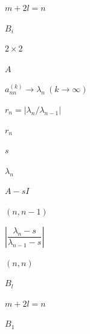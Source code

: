 \documentclass[UTF8,fontset=fandol]{ctexart}
\begin{document}
$m+2l=n$\par
$B_i$\par
$2\times2$\par
$A$\par
$a_{nn}^{(k)}\to\lambda_n\ (k\to\infty)$\par
$r_n=|\lambda_n/\lambda_{n-1}|$\par
$r_n$\par
$s$\par
$\lambda_n$\par
$A-sI$\par
$(n,n-1)$\par
$\left|\dfrac{\lambda_n-s}{\lambda_{n-1}-s}\right|$\par
$(n,n)$\par
$B_l$\par
$m+2l=n$\par
$B_1$\par
\clearpage
\end{document}
